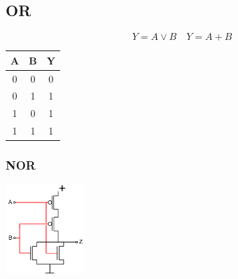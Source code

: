 \subsection{OR}
\begin{center}
    \begin{minipage}{0.55\linewidth}
        \begin{equation*}
            Y = A \lor B \quad Y = A + B
        \end{equation*}
        \begin{center}
        \end{center}
    \end{minipage}
    \hfill
    \begin{minipage}{0.35\linewidth}
        \begin{tabular}{|c c|c|}
            \hline
            A & B & Y\\
            \hline
            0 & 0 & 0\\
            0 & 1 & 1\\
            1 & 0 & 1\\
            1 & 1 & 1\\
            \hline
        \end{tabular}
    \end{minipage}
    \begin{minipage}[t]{0.45\linewidth}
        \subsubsection{NOR}
        \includegraphics[width = 30mm]{images/nor.png}
    \end{minipage}
    \begin{minipage}[t]{0.45\linewidth}

\end{minipage}
\end{center}
